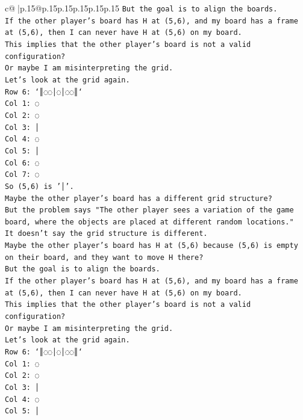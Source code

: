 \documentclass{article}
\begin{document}
{\begin{supertabular}{c@{$\;$}|p{.15\linewidth}@{}p{.15\linewidth}p{.15\linewidth}p{.15\linewidth}p{.15\linewidth}p{.15\linewidth}}
{{{\texttt{But the goal is to align the boards.} \\
\texttt{If the other player's board has H at (5,6), and my board has a frame at (5,6), then I can never have H at (5,6) on my board.} \\
\texttt{This implies that the other player's board is not a valid configuration?} \\
\texttt{Or maybe I am misinterpreting the grid.} \\
\texttt{Let's look at the grid again.} \\
\texttt{Row 6: `║◌◌│◌│◌◌║`} \\
\texttt{Col 1: ◌} \\
\texttt{Col 2: ◌} \\
\texttt{Col 3: │} \\
\texttt{Col 4: ◌} \\
\texttt{Col 5: │} \\
\texttt{Col 6: ◌} \\
\texttt{Col 7: ◌} \\
\texttt{So (5,6) is '│'.} \\
\texttt{Maybe the other player's board has a different grid structure?} \\
\texttt{But the problem says "The other player sees a variation of the game board, where the objects are placed at different random locations."} \\
\texttt{It doesn't say the grid structure is different.} \\
\texttt{Maybe the other player's board has H at (5,6) because (5,6) is empty on their board, and they want to move H there?} \\
\texttt{But the goal is to align the boards.} \\
\texttt{If the other player's board has H at (5,6), and my board has a frame at (5,6), then I can never have H at (5,6) on my board.} \\
\texttt{This implies that the other player's board is not a valid configuration?} \\
\texttt{Or maybe I am misinterpreting the grid.} \\
\texttt{Let's look at the grid again.} \\
\texttt{Row 6: `║◌◌│◌│◌◌║`} \\
\texttt{Col 1: ◌} \\
\texttt{Col 2: ◌} \\
\texttt{Col 3: │} \\
\texttt{Col 4: ◌} \\
\texttt{Col 5: │} \\
}}}
\end{supertabular}}
\end{document}
